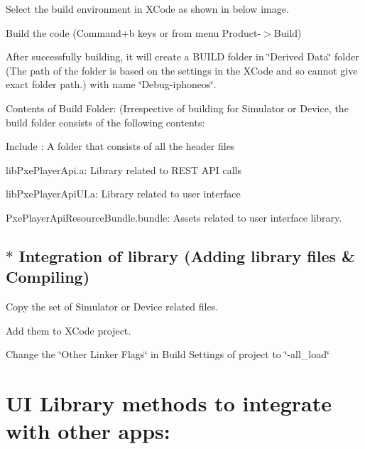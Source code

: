 \begin{DoxyEnumerate}
\item Select the build environment in X\-Code as shown in below image.
\item Build the code (Command+b keys or from menu Product-\/$>$Build)
\item After successfully building, it will create a B\-U\-I\-L\-D folder in \char`\"{}\-Derived Data\char`\"{} folder (The path of the folder is based on the settings in the X\-Code and so cannot give exact folder path.) with name \char`\"{}\-Debug-\/iphoneos\char`\"{}.
\end{DoxyEnumerate}
\begin{DoxyItemize}
\item Contents of Build Folder\-: (Irrespective of building for Simulator or Device, the build folder consists of the following contents\-:
\end{DoxyItemize}
\begin{DoxyEnumerate}
\item Include \-: A folder that consists of all the header files
\item lib\-Pxe\-Player\-Api.\-a\-: Library related to R\-E\-S\-T A\-P\-I calls
\item lib\-Pxe\-Player\-Api\-U\-I.\-a\-: Library related to user interface
\item Pxe\-Player\-Api\-Resource\-Bundle.\-bundle\-: Assets related to user interface library.
\end{DoxyEnumerate}\hypertarget{index_step5}{}\subsection{$\ast$ Integration of library (\-Adding library files \& Compiling)}\label{index_step5}

\begin{DoxyEnumerate}
\item Copy the set of Simulator or Device related files.
\item Add them to X\-Code project.
\item Change the \char`\"{}\-Other Linker Flags\char`\"{} in Build Settings of project to \char`\"{}-\/all\-\_\-load\char`\"{}
\end{DoxyEnumerate}\hypertarget{index_intro_sec}{}\section{U\-I Library methods to integrate with other apps\-:}\label{index_intro_sec}
